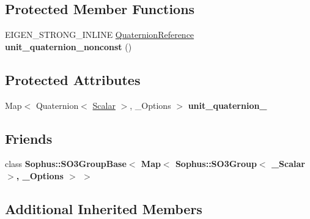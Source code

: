 \subsection*{Protected Member Functions}
\begin{DoxyCompactItemize}
\item 
E\+I\+G\+E\+N\+\_\+\+S\+T\+R\+O\+N\+G\+\_\+\+I\+N\+L\+I\+NE \hyperlink{class_sophus_1_1_s_o3_group_base_af58920cc70e59d58dcf427a22ebacaeb}{Quaternion\+Reference} {\bfseries unit\+\_\+quaternion\+\_\+nonconst} ()\hypertarget{class_eigen_1_1_map_3_01_sophus_1_1_s_o3_group_3_01___scalar_01_4_00_01___options_01_4_a27c57dd5e0495b6e9138b41be95f1ed3}{}\label{class_eigen_1_1_map_3_01_sophus_1_1_s_o3_group_3_01___scalar_01_4_00_01___options_01_4_a27c57dd5e0495b6e9138b41be95f1ed3}

\end{DoxyCompactItemize}
\subsection*{Protected Attributes}
\begin{DoxyCompactItemize}
\item 
Map$<$ Quaternion$<$ \hyperlink{class_sophus_1_1_s_o3_group_base_a31bf31815c195b7150da8a8e8c6f0189}{Scalar} $>$, \+\_\+\+Options $>$ {\bfseries unit\+\_\+quaternion\+\_\+}\hypertarget{class_eigen_1_1_map_3_01_sophus_1_1_s_o3_group_3_01___scalar_01_4_00_01___options_01_4_af3be4ecd04d8f9411af3267d79dee6a8}{}\label{class_eigen_1_1_map_3_01_sophus_1_1_s_o3_group_3_01___scalar_01_4_00_01___options_01_4_af3be4ecd04d8f9411af3267d79dee6a8}

\end{DoxyCompactItemize}
\subsection*{Friends}
\begin{DoxyCompactItemize}
\item 
class {\bfseries Sophus\+::\+S\+O3\+Group\+Base$<$ Map$<$ Sophus\+::\+S\+O3\+Group$<$ \+\_\+\+Scalar $>$, \+\_\+\+Options $>$ $>$}\hypertarget{class_eigen_1_1_map_3_01_sophus_1_1_s_o3_group_3_01___scalar_01_4_00_01___options_01_4_aead9ebd893d090c53f4da1322d9351d5}{}\label{class_eigen_1_1_map_3_01_sophus_1_1_s_o3_group_3_01___scalar_01_4_00_01___options_01_4_aead9ebd893d090c53f4da1322d9351d5}

\end{DoxyCompactItemize}
\subsection*{Additional Inherited Members}


